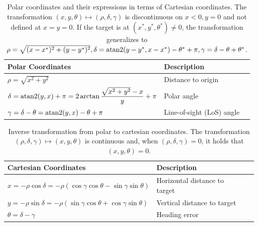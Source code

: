 \documentclass[journal,twoside,web]{ieeecolor}
\theoremstyle{definition}
\begin{document}
\begin{table}[t]
\small
\renewcommand\arraystretch{1.2}
\centering
\begin{tabular}{|l|l|l|}
\hline
\textbf{Polar Coordinates}  & \textbf{Description} \\
\hline
$\rho = \sqrt{x^2 + 
y^2}$  & Distance to origin \\
\hline
$\delta = \text{{\rm atan2}}(y ,x )  + \pi= 2\arctan\dfrac{\sqrt{x^2+y^2}-x}{y}+\pi$ & Polar  angle
\\
\hline
$\gamma = \delta - \theta =\text{{\rm atan2}}(y, x) - \theta + \pi$  & Line-of-sight (LoS) angle   \\
\hline
\end{tabular}
\caption{Polar coordinates and their expressions in terms of Cartesian coordinates. The transformation $(x,y,\theta)\mapsto (\rho,\delta,\gamma)$ is discontinuous on $x<0,y=0$ and not defined at $x=y=0$. If the target is at $(x^*, y^*, \theta^*)\neq 0$, the transformation generalizes to $\rho=\sqrt{(x-x^*)^2+(y-y^*)^2}, \delta= \text{{\rm atan2}}(y-y^* ,x-x^* ) -\theta^* + \pi, \gamma= \delta-\theta+\theta^*$.}
\label{tab:polar_coordinates}
\end{table}

\begin{table}[t]
\small
\centering
\begin{tabular}{|l|l|l|}
\hline
\textbf{Cartesian Coordinates}  & \textbf{Description} \\
\hline
$x  = -\rho \cos \delta = -\rho(\cos\gamma\cos\theta-\sin\gamma\sin\theta) $  & Horizontal distance to target \\
\hline
$y  = -\rho \sin \delta = -\rho(\sin\gamma\cos\theta+\cos\gamma\sin\theta)$  & Vertical distance to target   \\
\hline
$ \theta  = \delta - \gamma $ & Heading error \\ 
\hline
\end{tabular}
\caption{Inverse transformation from polar to cartesian coordinates. %
The transformation $(\rho,\delta,\gamma)\mapsto  (x,y,\theta)$ is continuous and, when $(\rho,\delta,\gamma)=0$, it holds that $(x,y,\theta)=0$.}%
\label{tab:inverse_polar_coordinates}
\end{table}
\end{document}
